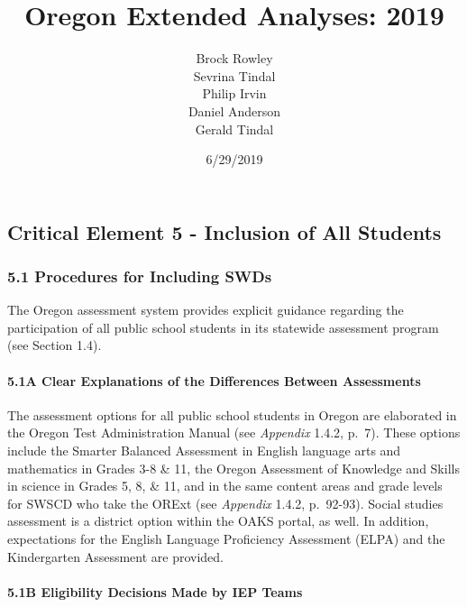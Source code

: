 \documentclass[]{article}
\title{Oregon Extended Analyses: 2019}
\author{Brock Rowley \\ Sevrina Tindal \\ Philip Irvin \\ Daniel Anderson \\ Gerald Tindal}
\date{6/29/2019}
\let\oldparagraph\paragraph
\renewcommand{\paragraph}[1]{\oldparagraph{#1}\mbox{}}
\begin{document}
\maketitle

{
\setcounter{tocdepth}{5}
\tableofcontents
}
\hypertarget{critical-element-5---inclusion-of-all-students}{%
\subsection{Critical Element 5 - Inclusion of All
Students}\label{critical-element-5---inclusion-of-all-students}}

\hypertarget{procedures-for-including-swds}{%
\subsubsection{5.1 Procedures for Including
SWDs}\label{procedures-for-including-swds}}

The Oregon assessment system provides explicit guidance regarding the
participation of all public school students in its statewide assessment
program (see Section 1.4).

\hypertarget{a-clear-explanations-of-the-differences-between-assessments}{%
\paragraph{5.1A Clear Explanations of the Differences Between
Assessments}\label{a-clear-explanations-of-the-differences-between-assessments}}

The assessment options for all public school students in Oregon are
elaborated in the Oregon Test Administration Manual (see \emph{Appendix}
1.4.2, p.~7). These options include the Smarter Balanced Assessment in
English language arts and mathematics in Grades 3-8 \& 11, the Oregon
Assessment of Knowledge and Skills in science in Grades 5, 8, \& 11, and
in the same content areas and grade levels for SWSCD who take the ORExt
(see \emph{Appendix} 1.4.2, p.~92-93). Social studies assessment is a
district option within the OAKS portal, as well. In addition,
expectations for the English Language Proficiency Assessment (ELPA) and
the Kindergarten Assessment are provided.

\hypertarget{b-eligibility-decisions-made-by-iep-teams}{%
\paragraph{5.1B Eligibility Decisions Made by IEP
Teams}\label{b-eligibility-decisions-made-by-iep-teams}}
\end{document}
